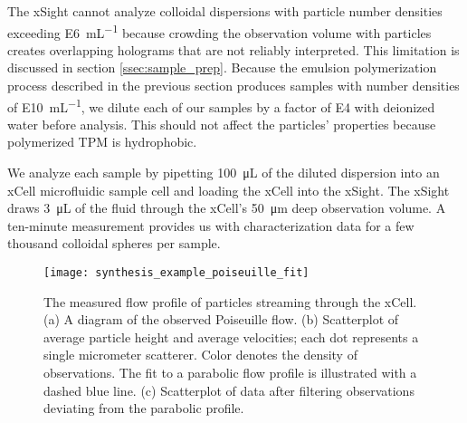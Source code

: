 The xSight cannot analyze colloidal dispersions with particle number densities exceeding
\SI{E6}{\milli\liter^{-1}} because crowding the observation volume with
particles creates overlapping holograms that are not reliably interpreted.
This limitation is discussed in section \ref{ssec:sample_prep}.
Because the emulsion polymerization process described in the previous section
produces samples with number densities of \SI{E10}{\milli\liter^{-1}},
we dilute each of our samples by a factor of \SI{E4}{} with
deionized water before analysis. This should not affect the particles'
properties because polymerized TPM is hydrophobic.

We analyze each sample by pipetting \SI{100}{\micro\liter} of the diluted
dispersion into an xCell microfluidic sample cell and loading the xCell into the xSight.
The xSight draws \SI{3}{\micro\liter} of the fluid through
the xCell's \SI{50}{\um} deep observation volume. A ten-minute measurement provides us with
characterization data for a few thousand colloidal spheres per sample.

\begin{figure}
    \centering
    \texttt{[image: synthesis\_example\_poiseuille\_fit]}
    \caption{The measured flow profile of particles streaming through the xCell.
      (a)  A diagram of the observed Poiseuille flow.\protect\footnotemark 
      (b) Scatterplot of average particle height and average velocities; each
      dot represents a single micrometer scatterer. Color denotes the density of
      observations. The fit to a parabolic flow profile is illustrated with a dashed
      blue line. (c) Scatterplot of data after filtering observations deviating
      from the parabolic profile.}
    \label{fig:flow_prof}
\end{figure}


